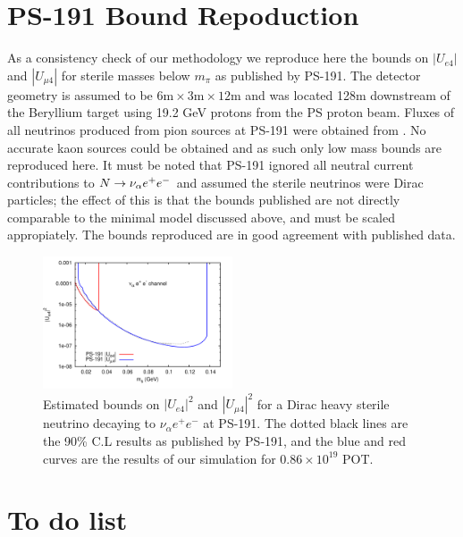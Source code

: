 \documentclass[11pt, a4paper]{article}
\def\ster{\ensuremath N}
\begin{document}
\section{PS-191 Bound Repoduction\label{sec:ps191}}

As a consistency check of our methodology we reproduce here the bounds on
$|U_{e4}|$ and $|U_{\mu 4}|$ for sterile masses below $m_\pi$ as published by
PS-191. The detector geometry is assumed to be $6\text{m} \times 3\text{m}
\times 12 \text{m}$ and was located 128m downstream of the Beryllium target
using 19.2 GeV protons from the PS proton beam.  Fluxes of all neutrinos
produced from pion sources at PS-191 were obtained from \cite{ps191THesis}. No
accurate kaon sources could be obtained and as such only low mass bounds are
reproduced here. It must be noted that PS-191 ignored all neutral current
contributions to $\ster \rightarrow \nu_\alpha e^+ e^-$ and assumed the sterile
neutrinos were Dirac particles; the effect of this is that the bounds published
are not directly comparable to the minimal model discussed above, and must be
scaled appropiately. The bounds reproduced are in good agreement with published
data.

\begin{figure}
			  \centering
			 
\includegraphics[width=0.5\textwidth]{figures/PS-191_test.pdf}

\caption{\label{fig:ps191test} Estimated bounds on $|U_{e4}|^2$ and $|U_{\mu
4}|^2$ for a Dirac heavy sterile neutrino decaying to $\nu_\alpha e^+ e^-$ at
PS-191. The dotted black lines are the 90\% C.L results as published by PS-191,
and the blue and red curves are the results of our simulation for $0.86 \times
10^{19}$ POT.}

\end{figure}


\newpage

\section{To do list}
\end{document}
